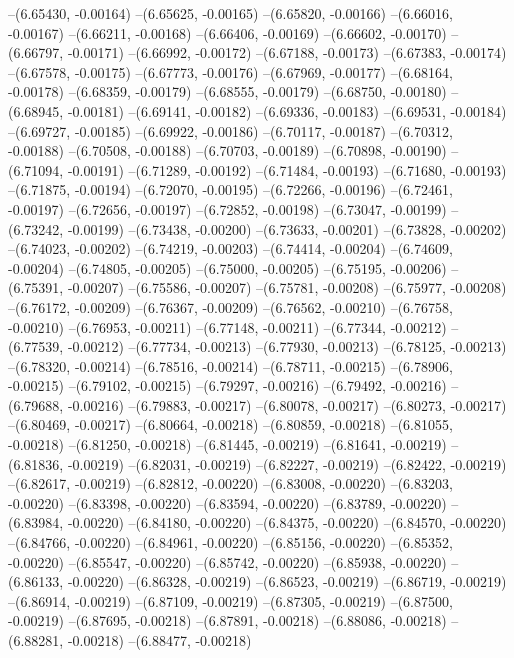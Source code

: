 --(6.65430, -0.00164)
--(6.65625, -0.00165)
--(6.65820, -0.00166)
--(6.66016, -0.00167)
--(6.66211, -0.00168)
--(6.66406, -0.00169)
--(6.66602, -0.00170)
--(6.66797, -0.00171)
--(6.66992, -0.00172)
--(6.67188, -0.00173)
--(6.67383, -0.00174)
--(6.67578, -0.00175)
--(6.67773, -0.00176)
--(6.67969, -0.00177)
--(6.68164, -0.00178)
--(6.68359, -0.00179)
--(6.68555, -0.00179)
--(6.68750, -0.00180)
--(6.68945, -0.00181)
--(6.69141, -0.00182)
--(6.69336, -0.00183)
--(6.69531, -0.00184)
--(6.69727, -0.00185)
--(6.69922, -0.00186)
--(6.70117, -0.00187)
--(6.70312, -0.00188)
--(6.70508, -0.00188)
--(6.70703, -0.00189)
--(6.70898, -0.00190)
--(6.71094, -0.00191)
--(6.71289, -0.00192)
--(6.71484, -0.00193)
--(6.71680, -0.00193)
--(6.71875, -0.00194)
--(6.72070, -0.00195)
--(6.72266, -0.00196)
--(6.72461, -0.00197)
--(6.72656, -0.00197)
--(6.72852, -0.00198)
--(6.73047, -0.00199)
--(6.73242, -0.00199)
--(6.73438, -0.00200)
--(6.73633, -0.00201)
--(6.73828, -0.00202)
--(6.74023, -0.00202)
--(6.74219, -0.00203)
--(6.74414, -0.00204)
--(6.74609, -0.00204)
--(6.74805, -0.00205)
--(6.75000, -0.00205)
--(6.75195, -0.00206)
--(6.75391, -0.00207)
--(6.75586, -0.00207)
--(6.75781, -0.00208)
--(6.75977, -0.00208)
--(6.76172, -0.00209)
--(6.76367, -0.00209)
--(6.76562, -0.00210)
--(6.76758, -0.00210)
--(6.76953, -0.00211)
--(6.77148, -0.00211)
--(6.77344, -0.00212)
--(6.77539, -0.00212)
--(6.77734, -0.00213)
--(6.77930, -0.00213)
--(6.78125, -0.00213)
--(6.78320, -0.00214)
--(6.78516, -0.00214)
--(6.78711, -0.00215)
--(6.78906, -0.00215)
--(6.79102, -0.00215)
--(6.79297, -0.00216)
--(6.79492, -0.00216)
--(6.79688, -0.00216)
--(6.79883, -0.00217)
--(6.80078, -0.00217)
--(6.80273, -0.00217)
--(6.80469, -0.00217)
--(6.80664, -0.00218)
--(6.80859, -0.00218)
--(6.81055, -0.00218)
--(6.81250, -0.00218)
--(6.81445, -0.00219)
--(6.81641, -0.00219)
--(6.81836, -0.00219)
--(6.82031, -0.00219)
--(6.82227, -0.00219)
--(6.82422, -0.00219)
--(6.82617, -0.00219)
--(6.82812, -0.00220)
--(6.83008, -0.00220)
--(6.83203, -0.00220)
--(6.83398, -0.00220)
--(6.83594, -0.00220)
--(6.83789, -0.00220)
--(6.83984, -0.00220)
--(6.84180, -0.00220)
--(6.84375, -0.00220)
--(6.84570, -0.00220)
--(6.84766, -0.00220)
--(6.84961, -0.00220)
--(6.85156, -0.00220)
--(6.85352, -0.00220)
--(6.85547, -0.00220)
--(6.85742, -0.00220)
--(6.85938, -0.00220)
--(6.86133, -0.00220)
--(6.86328, -0.00219)
--(6.86523, -0.00219)
--(6.86719, -0.00219)
--(6.86914, -0.00219)
--(6.87109, -0.00219)
--(6.87305, -0.00219)
--(6.87500, -0.00219)
--(6.87695, -0.00218)
--(6.87891, -0.00218)
--(6.88086, -0.00218)
--(6.88281, -0.00218)
--(6.88477, -0.00218)
